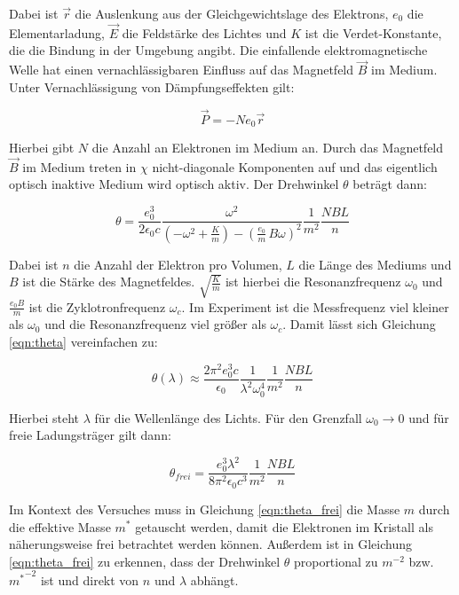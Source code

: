 Dabei ist $\vec{r}$ die Auslenkung aus der Gleichgewichtslage des Elektrons, $e_0$ die Elementarladung, $\vec{E}$ die Feldstärke des Lichtes und $K$ ist die Verdet-Konstante, die die Bindung in der Umgebung angibt. Die einfallende elektromagnetische Welle hat einen vernachlässigbaren Einfluss auf das Magnetfeld $\vec{B}$ im Medium. Unter Vernachlässigung von Dämpfungseffekten gilt:

\begin{equation}
    \vec{P} = - N e_0 \vec{r}
    \label{eqn:prop}
\end{equation}

Hierbei gibt $N$ die Anzahl an Elektronen im Medium an. Durch das Magnetfeld $\vec{B}$ im Medium treten in $\chi$ nicht-diagonale Komponenten auf und das eigentlich optisch inaktive Medium wird optisch aktiv. Der Drehwinkel $\theta$ beträgt dann:

\begin{equation}
    \theta = \frac{e_0^3}{2 \epsilon_0 c} \frac{\omega^2}{\left( - \omega^2 + \frac{K}{m} \right) - \left( \frac{e_0}{m} \, B \omega \right)^2} \frac{1}{m^2} \frac{N B L}{n}
    \label{eqn:theta}
\end{equation}

Dabei ist $n$ die Anzahl der Elektron pro Volumen, $L$ die Länge des Mediums und $B$ ist die Stärke des Magnetfeldes. $\sqrt{\frac{K}{m}}$ ist hierbei die Resonanzfrequenz $\omega_0$ und $\frac{e_0 B}{m}$ ist die Zyklotronfrequenz $\omega_c$. Im Experiment ist die Messfrequenz viel kleiner als $\omega_0$ und die Resonanzfrequenz viel größer als $\omega_c$. Damit lässt sich Gleichung \eqref{eqn:theta} vereinfachen zu:

\begin{equation}
    \theta ( \lambda ) \approx \frac{2 \pi^2 e_0^3 c}{\epsilon_0} \frac{1}{\lambda^2 \omega_0^4} \frac{1}{m^2} \frac{N B L}{n}
    \label{eqn:theta_approx}
\end{equation}

Hierbei steht $\lambda$ für die Wellenlänge des Lichts. Für den Grenzfall $\omega_0 \rightarrow 0$ und für freie Ladungsträger gilt dann:

\begin{equation}
    \theta_{frei} = \frac{e_0^3 \lambda^2}{8 \pi^2 \epsilon_0 c^3} \frac{1}{m^2} \frac{N B L}{n}
    \label{eqn:theta_frei}
\end{equation}

Im Kontext des Versuches muss in Gleichung \eqref{eqn:theta_frei} die Masse $m$ durch die effektive Masse $m^*$ getauscht werden, damit die Elektronen im Kristall als näherungsweise frei betrachtet werden können. Außerdem ist in Gleichung \eqref{eqn:theta_frei} zu erkennen, dass der Drehwinkel $\theta$ proportional zu $m^{-2}$ bzw. ${m^*}^{-2}$ ist und direkt von $n$ und $\lambda$ abhängt.

